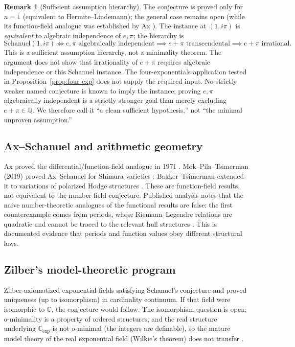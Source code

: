 \documentclass[11pt]{amsart}
\theoremstyle{definition}
\newtheorem{remark}[theorem]{Remark}
\theoremstyle{remark}
\numberwithin{equation}{section}
\newcommand{\Q}{\mathbb{Q}}
\newcommand{\C}{\mathbb{C}}
\newcommand{\ee}{e}
\begin{document}
\begin{remark}[Sufficient assumption hierarchy]
The conjecture is proved only for $n=1$ (equivalent to Hermite--Lindemann); the general case remains open \cite{Baker,MO33817} (while its function-field analogue was established by Ax \cite{Ax1971}). The instance at $(1,i\pi)$ is \emph{equivalent} to algebraic independence of $\ee,\pi$; the hierarchy is
\[
\text{Schanuel}(1,i\pi)\iff \ee,\pi\text{ algebraically independent}\implies e+\pi\text{ transcendental}\implies e+\pi\text{ irrational}.
\]
This is a sufficient assumption hierarchy, not a minimality theorem. The argument does not show that irrationality of $e+\pi$ requires algebraic independence or this Schanuel instance. The four-exponentials application tested in Proposition~\ref{prop:four-exp} does not supply the required input. No strictly weaker named conjecture is known to imply the instance; proving $\ee,\pi$ algebraically independent is a strictly stronger goal than merely excluding $e+\pi\in\Q$. We therefore call it ``a clean sufficient hypothesis,'' not ``the minimal unproven assumption.''
\end{remark}

\subsection{Ax--Schanuel and arithmetic geometry}

Ax proved the differential/function-field analogue in 1971 \cite{Ax1971}. Mok--Pila--Tsimerman (2019) proved Ax--Schanuel for Shimura varieties \cite{MPT2019}; Bakker--Tsimerman extended it to variations of polarized Hodge structures \cite{BakkerTsimerman2019}. These are function-field results, not equivalent to the number-field conjecture. Published analysis notes that the naive number-theoretic analogues of the functional results are false: the first counterexample comes from periods, whose Riemann--Legendre relations are quadratic and cannot be traced to the relevant hull structures \cite{CambridgeFF}. This is documented evidence that periods and function values obey different structural laws.

\subsection{Zilber's model-theoretic program}

Zilber axiomatized exponential fields satisfying Schanuel's conjecture and proved uniqueness (up to isomorphism) in cardinality continuum. If that field were isomorphic to $\C$, the conjecture would follow. The isomorphism question is open; o-minimality is a property of ordered structures, and the real structure underlying $\C_{\exp}$ is not o-minimal (the integers are definable), so the mature model theory of the real exponential field (Wilkie's theorem) does not transfer \cite{MO33817}.
\end{document}
